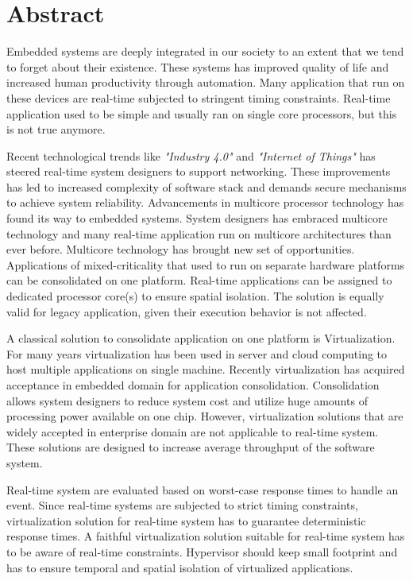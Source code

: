 \chapter*{Abstract}
Embedded systems are deeply integrated in our society to an extent that we tend to forget about their existence.
These systems has improved quality of life and increased human productivity through automation.
Many application that run on these devices are real-time subjected to stringent timing constraints.
Real-time application used to be simple and usually ran on single core processors, but this is not true anymore. 

Recent technological trends like \emph{"Industry 4.0"} and \emph{"Internet of Things"}
has steered real-time system designers to support networking.
These improvements has led to increased complexity of software stack and demands secure 
mechanisms to achieve system reliability.
Advancements in multicore processor technology has found its way to embedded systems. 
System designers has embraced multicore technology and many real-time application run on multicore architectures than ever before.
Multicore technology has brought new set of opportunities.
Applications of mixed-criticality that used to run on separate hardware platforms can be consolidated on one platform.
Real-time applications can be assigned to dedicated processor core(s) to ensure spatial isolation. 
The solution is equally valid for legacy application, given their execution behavior
is not affected.

A classical solution to consolidate application on one platform is Virtualization.
For many years virtualization has been used in server and cloud computing to host multiple applications
on single machine.
Recently virtualization has acquired acceptance in embedded domain for application consolidation.
Consolidation allows system designers to reduce system cost and utilize huge amounts of processing power available on one chip.
However, virtualization solutions that are widely accepted in enterprise domain are not applicable to 
real-time system. 
These solutions are designed to increase average throughput of the software system.

Real-time system are evaluated based on worst-case response times to handle an event.
Since real-time systems are subjected to strict timing constraints, virtualization
solution for real-time system has to guarantee deterministic response times.
A faithful virtualization solution suitable for real-time system has to
be aware of real-time constraints. Hypervisor should keep small footprint and 
has to ensure temporal and spatial isolation of virtualized applications.

